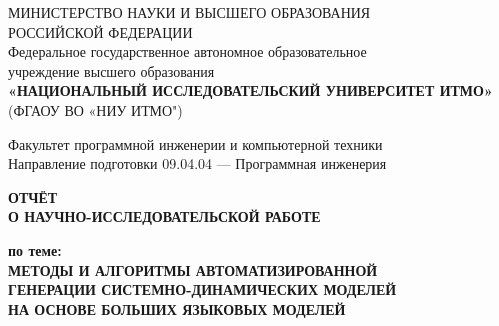 
\begin{titlepage}
    \thispagestyle{empty}
    \setlength{\parindent}{0pt}

    \begin{center}
        \small
        МИНИСТЕРСТВО НАУКИ И ВЫСШЕГО ОБРАЗОВАНИЯ\\
        РОССИЙСКОЙ ФЕДЕРАЦИИ\\[6pt]
        Федеральное государственное автономное образовательное\\
        учреждение высшего образования\\
        \textbf{«НАЦИОНАЛЬНЫЙ ИССЛЕДОВАТЕЛЬСКИЙ УНИВЕРСИТЕТ ИТМО»}\\
        (ФГАОУ ВО «НИУ ИТМО")
    \end{center}

    \vspace{1.5cm}

    \begin{center}
        \small
        Факультет программной инженерии и компьютерной техники\\[3pt]
        Направление подготовки 09.04.04 --- Программная инженерия
    \end{center}

    \vspace{2cm}

    \begin{center}
        \large\bfseries
        ОТЧЁТ\\
        О НАУЧНО-ИССЛЕДОВАТЕЛЬСКОЙ РАБОТЕ
    \end{center}

    \vspace{1cm}

    \begin{center}
        \large\bfseries
        по теме:\\[0.5cm]
        \Large
        МЕТОДЫ И АЛГОРИТМЫ АВТОМАТИЗИРОВАННОЙ\\
        ГЕНЕРАЦИИ СИСТЕМНО-ДИНАМИЧЕСКИХ МОДЕЛЕЙ\\
        НА ОСНОВЕ БОЛЬШИХ ЯЗЫКОВЫХ МОДЕЛЕЙ
    \end{center}

    \vspace{2cm}


\end{titlepage}
